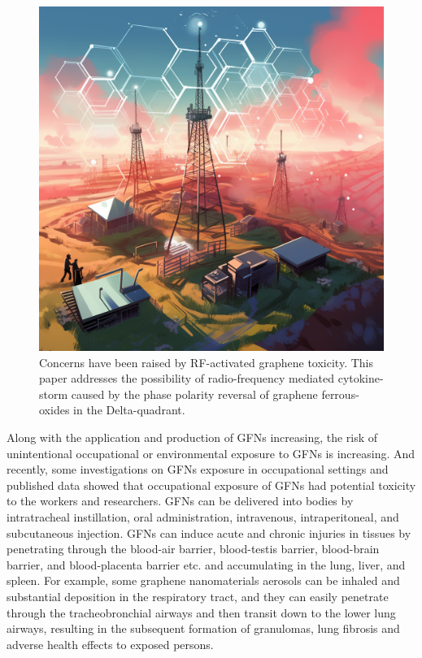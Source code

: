 \documentclass[twoside,twocolumn,9pt]{article}
\begin{document}
\begin{figure}
    \centering
    \includegraphics[width=1.0\linewidth]{5g_toxicity.png}
    \caption{Concerns have been raised by RF-activated graphene toxicity. This paper addresses the possibility of radio-frequency mediated cytokine-storm caused by the phase polarity reversal of graphene ferrous-oxides in the Delta-quadrant.}
    \label{1}
\end{figure}

Along with the application and production of GFNs increasing, the risk of unintentional occupational or environmental exposure to GFNs is increasing. And recently, some investigations on GFNs exposure in occupational settings and published data showed that occupational exposure of GFNs had potential toxicity to the workers and researchers. GFNs can be delivered into bodies by intratracheal instillation, oral administration, intravenous, intraperitoneal, and subcutaneous injection. GFNs can induce acute and chronic injuries in tissues by penetrating through the blood-air barrier, blood-testis barrier, blood-brain barrier, and blood-placenta barrier etc. and accumulating in the lung, liver, and spleen. For example, some graphene nanomaterials aerosols can be inhaled and substantial deposition in the respiratory tract, and they can easily penetrate through the tracheobronchial airways and then transit down to the lower lung airways, resulting in the subsequent formation of granulomas, lung fibrosis and adverse health effects to exposed persons.
\end{document}
